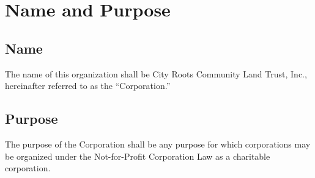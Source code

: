 \section{Name and Purpose}

\subsection{Name}
The name of this organization shall be City Roots Community Land Trust,
Inc., hereinafter referred to as the ``Corporation.''

\subsection{Purpose}
The purpose of the Corporation shall be any purpose for which
corporations may be organized under the Not-for-Profit Corporation Law
as a charitable corporation.

